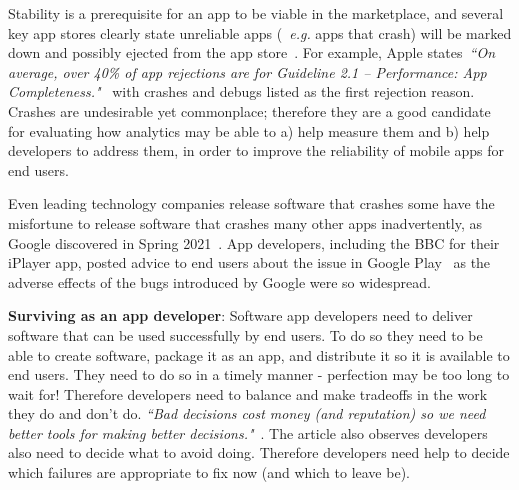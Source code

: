 Stability is a prerequisite for an app to be viable in the marketplace, and several key app stores clearly state unreliable apps (~\emph{e.g.} apps that crash) will be marked down and possibly ejected from the app store~\citep{appleappstore2021_app_completeness, google_play_policy_center_broken_functionality, huaweidevelopers_appgallery_review_guidelines}. For example, Apple states~\emph{``On average, over 40\% of app rejections are for Guideline 2.1 – Performance: App Completeness."}~\citep{appleappstore2021_review_avoiding_common_app_rejections} with crashes and debugs listed as the first rejection reason. %
Crashes are undesirable yet commonplace; therefore they are a good candidate for evaluating how analytics may be able to a) help measure them and b) help developers to address them, in order to improve the reliability of mobile apps for end users.


Even leading technology companies release software that crashes some have the misfortune to release software that crashes many other apps inadvertently, as Google discovered in Spring 2021~\citep{bbcnews2021_google_fixes_crashing_android_app_issues}. App developers, including the BBC for their iPlayer app, posted advice to end users about the issue in Google Play~\citep{bbc_iplayer_app_april_2021_webview_information} as the adverse effects of the bugs introduced by Google were so widespread.

\medskip
\textbf{Surviving as an app developer}: Software app developers need to deliver software that can be used successfully by end users. To do so they need to be able to create software, package it as an app, and distribute it so it is available to end users. 
%
They need to do so in a timely manner - perfection may be too long to wait for! Therefore developers need to balance and make tradeoffs in the work they do and don't do. \emph{``Bad decisions cost money (and reputation) so we need better tools for making better decisions."}~\citep[p.115]{tantithamthavorn2021_actionable_analytics_tell_me_what_to_do}. The article also observes developers also need to decide what to avoid doing. Therefore developers need help to decide which failures are appropriate to fix now (and which to leave be).

